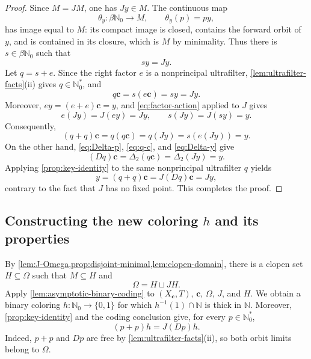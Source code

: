 \documentclass[reqno,12pt]{amsart}
\newcommand{\Nzero}{\mathbb N_0}
\newcommand{\bN}{\beta\Nzero}
\newcommand{\Nstar}{\Nzero^{*}}
\newcommand{\two}{\{0,1\}}
\def \N {\mathbb N}
\numberwithin{equation}{section}
\begin{document}
\begin{proof}
Since $M=JM$, one has $Jy\in M$.  The continuous map
\[
   \theta_y:\bN\longrightarrow M,
   \qquad
   \theta_y(p)=py,
\]
has image equal to $M$: its compact image is closed, contains the forward
orbit of $y$, and is contained in its closure, which is $M$ by minimality.
Thus there is $s\in\bN$ such that
\begin{equation}\label{eq:s-y}
   sy=Jy.
\end{equation}
Let $q=s+e$.  Since the right factor $e$ is a nonprincipal ultrafilter,
\cref{lem:ultrafilter-facts}(ii) gives $q\in\Nstar$, and
\begin{equation}\label{eq:q-c}
   q\mathbf c=s(e\mathbf c)=sy=Jy.
\end{equation}
Moreover, $ey=(e+e)\mathbf c=y$, and \eqref{eq:factor-action} applied to
$J$ gives
\[
   e(Jy)=J(ey)=Jy,
   \qquad
   s(Jy)=J(sy)=y.
\]
Consequently,
\begin{equation}\label{eq:qplusq-c}
   (q+q)\mathbf c
   =q(q\mathbf c)
   =q(Jy)
   =s(e(Jy))
   =y.
\end{equation}
On the other hand, \eqref{eq:Delta-p}, \eqref{eq:q-c}, and
\eqref{eq:Delta-y} give
\begin{equation}\label{eq:Dq-c}
   (Dq)\mathbf c
   =\Delta_2(q\mathbf c)
   =\Delta_2(Jy)
   =y.
\end{equation}
Applying \cref{prop:key-identity} to the same nonprincipal ultrafilter $q$ yields
\[
   y=(q+q)\mathbf c=J(Dq)\mathbf c=Jy,
\]
contrary to the fact that $J$ has no fixed point. This completes the proof.
\end{proof}



\subsection{Constructing the new coloring \texorpdfstring{$h$}{h} and its properties}

By \cref{lem:J-Omega,prop:disjoint-minimal,lem:clopen-domain}, there is
a clopen set $H\subseteq\Omega$ such that $M\subseteq H$ and
\begin{equation}\label{eq:H-domain}
\Omega=H\sqcup JH.
\end{equation}
Apply \cref{lem:asymptotic-binary-coding} to $(X_{\mathbf c},T)$,
$\mathbf c$, $\Omega$, $J$, and $H$. We obtain a binary coloring
$h:\Nzero\to\two$ for which $h^{-1}(1)\cap\N$ is thick in $\N$. Moreover,
\cref{prop:key-identity} and the coding conclusion give, for every
$p\in\Nstar$,
\begin{equation}\label{eq:h-identity}
(p+p)h=J(Dp)h.
\end{equation}
Indeed, $p+p$ and $Dp$ are free by
\cref{lem:ultrafilter-facts}(ii), so both orbit limits belong to $\Omega$.
\end{document}
